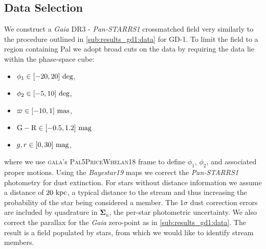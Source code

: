 \documentclass[twocolumn, linenumbers]{aastex631}
\newcommand{\code}[1]{\textsc{#1}}
\newcommand{\package}[1]{\code{#1}}
\newcommand{\stream}[1]{#1}
\newcommand{\dataarchive}[1]{\textit{#1}}
\newcommand{\Gaia}{\dataarchive{Gaia}}
\newcommand{\PanStarrs}{\dataarchive{Pan-STARRS1}}
\newcommand{\mbs}[1]{\boldsymbol{#1}}
\newcommand{\parallax}{\varpi}
\begin{document}
    \subsection{Data Selection} \label{sub:results_pal5:data}

        We construct a \Gaia{} DR3 - \PanStarrs{} crossmatched field very
        similarly to the procedure outlined in \autoref{sub:results_gd1:data}
        for \stream{GD-1}.  To limit the field to a region containing
        \stream{Pal} we adopt broad cuts on the data by requiring the data
        lie within the phase-space cube:
        \begin{itemize}
            \setlength\itemsep{0em}
            \item $\phi_1 \in [-20, 20] \ \rm{deg}$,
            \item $\phi_2 \in [-5, 10] \ \rm{deg}$,
            \item $\parallax \in [-10, 1] \ \rm{mas}$,
            \item $\rm{G-R} \in [-0.5, 1.2] \ \rm{mag}$
            \item $g, r \in [0, 30] \ \rm{mag}$,
        \end{itemize}
        where we use \package{gala}'s \code{Pal5PriceWhelan18} frame
        \citep{Price-Whelan+2019} to define $\phi_1$, $\phi_2$, and associated
        proper motions.  Using the \textit{Bayestar19} maps we correct the
        \PanStarrs{} photometry for dust extinction.  For stars without distance
        information we assume a distance of $20 \ \rm{kpc}$, a typical distance
        to the stream \citep{Harris1996, Odenkirchen2003, Grillmair2006,
        Ibata+2016, Price-Whelan+2019} and thus increasing the probability of
        the star being considered a member.  The 1$\sigma$ dust correction
        errors are included by quadrature in $\mbs{\Sigma}_n$, the per-star
        photometric uncertainty. We also correct the parallax for the \Gaia{}
        zero-point as in \autoref{sub:results_gd1:data}.  The result is a field
        populated by  stars, from which
        we would like to identify stream members.
\end{document}
